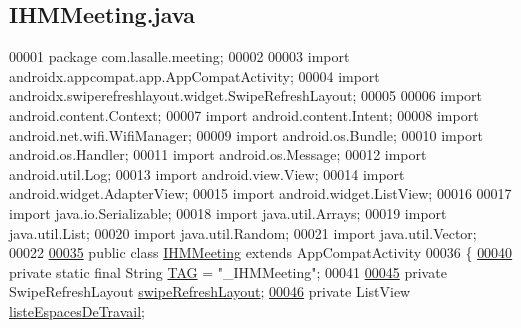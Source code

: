 \hypertarget{_i_h_m_meeting_8java_source}{}\subsection{I\+H\+M\+Meeting.\+java}
\label{_i_h_m_meeting_8java_source}

\begin{DoxyCode}
00001 \textcolor{keyword}{package }com.lasalle.meeting;
00002 
00003 \textcolor{keyword}{import} androidx.appcompat.app.AppCompatActivity;
00004 \textcolor{keyword}{import} androidx.swiperefreshlayout.widget.SwipeRefreshLayout;
00005 
00006 \textcolor{keyword}{import} android.content.Context;
00007 \textcolor{keyword}{import} android.content.Intent;
00008 \textcolor{keyword}{import} android.net.wifi.WifiManager;
00009 \textcolor{keyword}{import} android.os.Bundle;
00010 \textcolor{keyword}{import} android.os.Handler;
00011 \textcolor{keyword}{import} android.os.Message;
00012 \textcolor{keyword}{import} android.util.Log;
00013 \textcolor{keyword}{import} android.view.View;
00014 \textcolor{keyword}{import} android.widget.AdapterView;
00015 \textcolor{keyword}{import} android.widget.ListView;
00016 
00017 \textcolor{keyword}{import} java.io.Serializable;
00018 \textcolor{keyword}{import} java.util.Arrays;
00019 \textcolor{keyword}{import} java.util.List;
00020 \textcolor{keyword}{import} java.util.Random;
00021 \textcolor{keyword}{import} java.util.Vector;
00022 
\hyperlink{classcom_1_1lasalle_1_1meeting_1_1_i_h_m_meeting}{00035} \textcolor{keyword}{public} \textcolor{keyword}{class }\hyperlink{classcom_1_1lasalle_1_1meeting_1_1_i_h_m_meeting}{IHMMeeting} \textcolor{keyword}{extends} AppCompatActivity
00036 \{
\hyperlink{classcom_1_1lasalle_1_1meeting_1_1_i_h_m_meeting_a239eafcb0ccc896bdba538d1c0f08e65}{00040}     \textcolor{keyword}{private} \textcolor{keyword}{static} \textcolor{keyword}{final} String \hyperlink{classcom_1_1lasalle_1_1meeting_1_1_i_h_m_meeting_a239eafcb0ccc896bdba538d1c0f08e65}{TAG} = \textcolor{stringliteral}{"\_IHMMeeting"}; 
00041 
\hyperlink{classcom_1_1lasalle_1_1meeting_1_1_i_h_m_meeting_a64f84fda5f7f595cf0c75ccfb189af8d}{00045}     \textcolor{keyword}{private} SwipeRefreshLayout \hyperlink{classcom_1_1lasalle_1_1meeting_1_1_i_h_m_meeting_a64f84fda5f7f595cf0c75ccfb189af8d}{swipeRefreshLayout}; 
\hyperlink{classcom_1_1lasalle_1_1meeting_1_1_i_h_m_meeting_ae32ea3420cbe17af0b32df447e326427}{00046}     \textcolor{keyword}{private} ListView \hyperlink{classcom_1_1lasalle_1_1meeting_1_1_i_h_m_meeting_ae32ea3420cbe17af0b32df447e326427}{listeEspacesDeTravail}; 

\end{DoxyCode}
